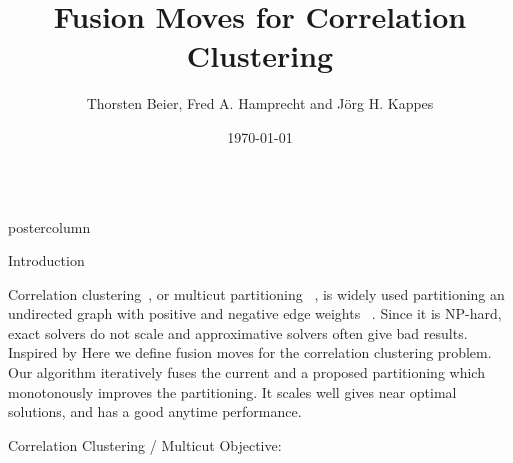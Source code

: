 \documentclass[final,hyperref={pdfpagelabels=false}]{beamer}
\title{\huge Fusion Moves for Correlation Clustering}
\author{Thorsten Beier, Fred A. Hamprecht and J\"org H. Kappes }
\institute[RWTH Aachen University]{Heidelberg Collaboratory for Image Processing, University of Heidelberg, Germany}
\date[\today]{\today}
\newlength{\columnheight}
\begin{document}
\begin{frame}
  \begin{columns}
    \begin{column}{.49\textwidth}
      \begin{beamercolorbox}[center,wd=\textwidth]{postercolumn}
        \begin{minipage}[T]{.95\textwidth}  %
          \parbox[t][\columnheight]{\textwidth}{ %
            \begin{block}{Introduction}


            Correlation clustering~\cite{Bansal-2002}, or multicut partitioning~\cite{chopra_1993_mp} ,
            is widely used partitioning an undirected graph with positive and negative edge weights
            ~\cite{andres_2011_iccv,kroeger_2012_eccv,yarkony_2012_eccv,alush_2013_simbad}.
            Since it is NP-hard, exact solvers do not scale and approximative solvers often give bad results.
            Inspired by \cite{Lempitsky-2010} Here we define fusion moves for the correlation clustering problem.
            Our algorithm iteratively fuses the current and a proposed partitioning which  monotonously improves
            the partitioning. It scales well gives near optimal solutions, and has
            a good anytime performance.
           
            \end{block}
            \vfill
            \begin{block}{Correlation Clustering / Multicut Objective:}


\end{block}}
\end{minipage}
\end{beamercolorbox}
\end{column}
\end{columns}
\end{frame}
\end{document}
